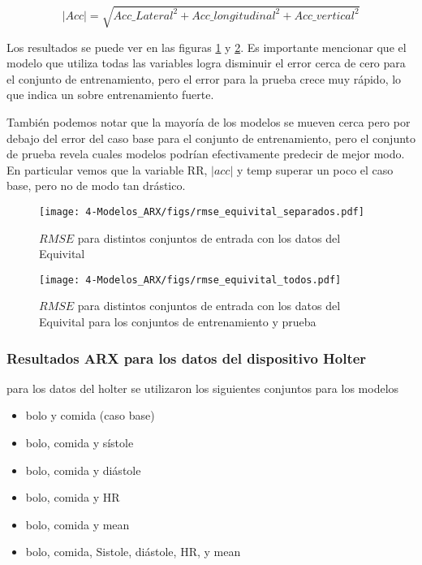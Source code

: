 \begin{equation}\label{eq_acc}
	|Acc| = \sqrt{Acc\_Lateral^2 + Acc\_longitudinal^2 +Acc\_vertical^2 }
\end{equation}

Los resultados se puede ver en las figuras \ref{fig:rmse_equivital_separados} y \ref{fig:rmse_equivital_todos}. Es importante mencionar que el modelo que utiliza todas las variables logra disminuir el error cerca de cero para el conjunto de entrenamiento, pero el error para la prueba crece muy rápido, lo que indica un sobre entrenamiento fuerte.

También podemos notar que la mayoría de los modelos se mueven cerca pero por debajo del error del caso base para el conjunto de entrenamiento, pero el conjunto de prueba revela cuales modelos podrían efectivamente predecir de mejor modo. En particular vemos que la variable RR, $|acc|$ y temp superar un poco el caso base, pero no de modo tan drástico. 

\begin{figure}[H]
	\centering
	\texttt{[image: 4-Modelos\_ARX/figs/rmse\_equivital\_separados.pdf]}
	\caption{$RMSE$ para distintos conjuntos de entrada con los datos del Equivital}
	\label{fig:rmse_equivital_separados}
\end{figure}

\begin{figure}[H]
	\centering
	\texttt{[image: 4-Modelos\_ARX/figs/rmse\_equivital\_todos.pdf]}
	\caption{$RMSE$ para distintos conjuntos de entrada con los datos del Equivital para los conjuntos de entrenamiento y prueba}
	\label{fig:rmse_equivital_todos}
\end{figure}


\subsubsection*{Resultados ARX para los datos del dispositivo Holter}

para los datos del holter se utilizaron los siguientes conjuntos para los modelos

\begin{itemize}
	\item bolo y comida (caso base)
	
	\item bolo, comida y sístole
	
	\item bolo, comida y diástole
	
	\item bolo, comida y HR
	
	\item bolo, comida y mean
	
	\item bolo, comida, Sistole, diástole, HR, y mean
\end{itemize}

